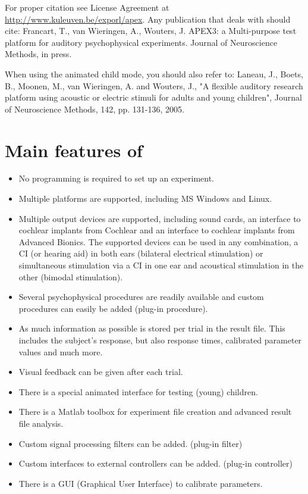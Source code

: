For proper citation see License Agreement at
\url{http://www.kuleuven.be/exporl/apex}. Any publication that
deals with \apex should cite: Francart, T., van Wieringen, A.,
Wouters, J. APEX3: a Multi-purpose test platform for auditory
psychophysical experiments. Journal of Neuroscience Methods, in
press.


When using the animated child mode, you should also refer to:
Laneau, J., Boets, B., Moonen, M., van Wieringen, A. and Wouters,
J., "A flexible auditory research platform using acoustic or
electric stimuli for adults and young children", Journal of
Neuroscience Methods, 142, pp. 131-136, 2005.

\section {Main features of \apex}
\begin{itemize}
\item No programming is required to set up an experiment. \item
Multiple platforms are supported, including MS Windows and Linux.
\item Multiple output devices are supported, including sound
cards, an interface to cochlear implants from Cochlear and an
interface to cochlear implants from Advanced  Bionics. The
supported devices can be used in any combination, a CI (or hearing
aid) in both ears (bilateral electrical stimulation) or
simultaneous stimulation via a CI in one ear and acoustical
stimulation in the other (bimodal stimulation). \item Several
psychophysical procedures are readily available and custom
procedures can easily be added (plug-in procedure). \item As much
information as possible is stored per trial in the result file.
This includes the subject's response, but also response times,
calibrated parameter values and much more. \item Visual feedback
can be given after each trial. \item There is a special animated
interface for testing (young) children. \item There is a Matlab
toolbox for experiment file creation and advanced result file
analysis. \item Custom signal processing filters can be added.
(plug-in filter) \item Custom interfaces to external controllers
can be added. (plug-in controller) \item There is a {GUI}
(Graphical User Interface) to calibrate parameters.
\end{itemize}

